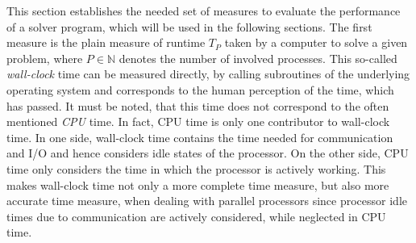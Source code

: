 This section establishes the needed set of measures to evaluate the performance of a solver program, which will be used in the following sections. The first measure is the plain measure of runtime \(T_P\) taken by a computer to solve a given problem, where \(P \in \mathbb{N}\) denotes the number of involved processes. This so-called \emph{wall-clock} time can be measured directly, by calling subroutines of the underlying operating system and corresponds to the human perception of the time, which has passed. It must be noted, that this time does not correspond to the often mentioned \emph{CPU} time. In fact, CPU time is only one contributor to wall-clock time. In one side, wall-clock time contains the time needed for communication and I/O and hence considers idle states of the processor. On the other side, CPU time only considers the time in which the processor is actively working. This makes wall-clock time not only a more complete time measure, but also more accurate time measure, when dealing with parallel processors since processor idle times due to communication are actively considered, while neglected in CPU time.

